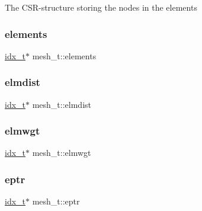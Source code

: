 The C\+S\+R-\/structure storing the nodes in the elements \mbox{\label{structmesh__t_aa69fab4095fa702868b0f40eb79d8e00}} 
\subsubsection{\texorpdfstring{elements}{elements}}
{\footnotesize\ttfamily \hyperlink{3rd_party_2parmetis-4_80_83_2metis_2include_2metis_8h_aaa5262be3e700770163401acb0150f52}{idx\+\_\+t}$\ast$ mesh\+\_\+t\+::elements}

\mbox{\label{structmesh__t_aea78593f8f3ecb6e3ca87c9831812db3}} 
\subsubsection{\texorpdfstring{elmdist}{elmdist}}
{\footnotesize\ttfamily \hyperlink{3rd_party_2parmetis-4_80_83_2metis_2include_2metis_8h_aaa5262be3e700770163401acb0150f52}{idx\+\_\+t}$\ast$ mesh\+\_\+t\+::elmdist}

\mbox{\label{structmesh__t_ace3783c80f252853712db84524c47c4a}} 
\subsubsection{\texorpdfstring{elmwgt}{elmwgt}}
{\footnotesize\ttfamily \hyperlink{3rd_party_2parmetis-4_80_83_2metis_2include_2metis_8h_aaa5262be3e700770163401acb0150f52}{idx\+\_\+t}$\ast$ mesh\+\_\+t\+::elmwgt}

\mbox{\label{structmesh__t_abe330de09173a4faac6dbf76f1ae90f8}} 
\subsubsection{\texorpdfstring{eptr}{eptr}}
{\footnotesize\ttfamily \hyperlink{3rd_party_2parmetis-4_80_83_2metis_2include_2metis_8h_aaa5262be3e700770163401acb0150f52}{idx\+\_\+t}$\ast$ mesh\+\_\+t\+::eptr}

